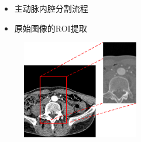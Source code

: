 \begin{frame}
\begin{itemize}
\item 主动脉内腔分割流程
\end{itemize}
\begin{figure}[t]
\centering

\end{figure}
\end{frame}

\begin{frame}
\begin{itemize}
\item 原始图像的ROI提取
\end{itemize}
\begin{figure}[t]
\centering
\includegraphics[width=2.0in]{../../Figures/gac/ROI.eps}
\end{figure}
\end{frame}


